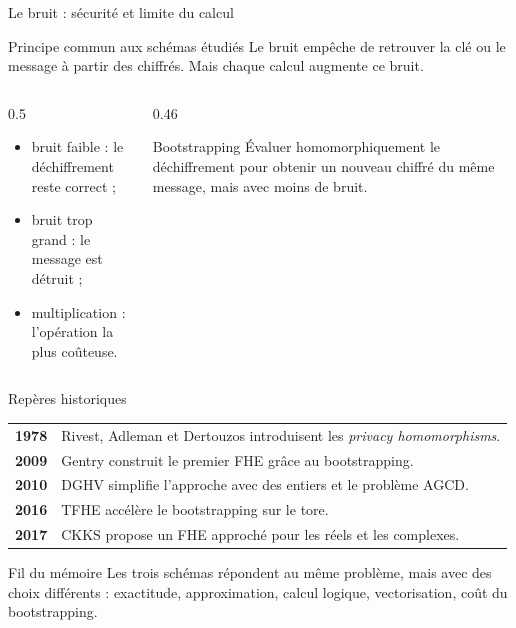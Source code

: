 \documentclass[10pt,aspectratio=169]{beamer}
\begin{document}
\begin{frame}{Le bruit : sécurité et limite du calcul}
  \begin{block}{Principe commun aux schémas étudiés}
    Le bruit empêche de retrouver la clé ou le message à partir des chiffrés. Mais chaque calcul augmente ce bruit.
  \end{block}

  \begin{columns}[T,onlytextwidth]
    \begin{column}{0.5\textwidth}
      \begin{itemize}
        \item bruit faible : le déchiffrement reste correct ;
        \item bruit trop grand : le message est détruit ;
        \item multiplication : l'opération la plus coûteuse.
      \end{itemize}
    \end{column}
    \begin{column}{0.46\textwidth}
      \begin{exampleblock}{Bootstrapping}
        Évaluer homomorphiquement le déchiffrement pour obtenir un nouveau chiffré du même message, mais avec moins de bruit.
      \end{exampleblock}
    \end{column}
  \end{columns}
\end{frame}

\begin{frame}{Repères historiques}
  \small
  \begin{tabularx}{\textwidth}{@{}lX@{}}
    \toprule
    \textbf{1978} & Rivest, Adleman et Dertouzos introduisent les \textit{privacy homomorphisms}.\\
    \textbf{2009} & Gentry construit le premier FHE grâce au bootstrapping.\\
    \textbf{2010} & DGHV simplifie l'approche avec des entiers et le problème AGCD.\\
    \textbf{2016} & TFHE accélère le bootstrapping sur le tore.\\
    \textbf{2017} & CKKS propose un FHE approché pour les réels et les complexes.\\
    \bottomrule
  \end{tabularx}

  \vspace{0.35cm}
  \begin{block}{Fil du mémoire}
    Les trois schémas répondent au même problème, mais avec des choix différents : exactitude, approximation, calcul logique, vectorisation, coût du bootstrapping.
  \end{block}
\end{frame}
\end{document}

